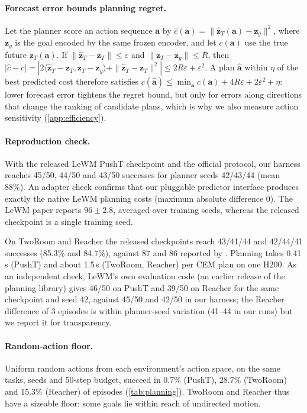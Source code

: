 \paragraph{Forecast error bounds planning regret.} Let the planner score an action sequence $\mathbf{a}$ by
$\hat c(\mathbf{a})=\|\hat{\mathbf{z}}_T(\mathbf{a})-\mathbf{z}_g\|^2$, where $\mathbf{z}_g$ is the goal encoded by the same
frozen encoder, and let $c(\mathbf{a})$ use the true future $\mathbf{z}_T(\mathbf{a})$. If
$\|\hat{\mathbf{z}}_T-\mathbf{z}_T\|\le\varepsilon$ and $\|\mathbf{z}_T-\mathbf{z}_g\|\le R$, then
$|\hat c-c|=|2\langle\hat{\mathbf{z}}_T-\mathbf{z}_T,\mathbf{z}_T-\mathbf{z}_g\rangle+\|\hat{\mathbf{z}}_T-\mathbf{z}_T\|^2|\le2R\varepsilon+\varepsilon^2$.
A plan $\hat{\mathbf{a}}$ within $\eta$ of the best predicted cost therefore satisfies
$c(\hat{\mathbf{a}})\le\min_{\mathbf{a}}c(\mathbf{a})+4R\varepsilon+2\varepsilon^2+\eta$: lower forecast error tightens the
regret bound, but only for errors along directions that change the ranking of candidate plans, which is why we also
measure action sensitivity (\cref{app:efficiency}).

\paragraph{Reproduction check.} With the released LeWM PushT checkpoint and the official protocol,
our harness reaches 45/50, 44/50 and 43/50 successes for planner seeds 42/43/44 (mean 88\%). An
adapter check confirms that our pluggable predictor interface produces exactly the native LeWM
planning costs (maximum absolute difference 0). The LeWM paper reports $96\pm2.8$, averaged over
training seeds, whereas the released checkpoint is a single training seed.

On TwoRoom and Reacher the
released checkpoints reach 43/41/44 and 42/44/41 successes (85.3\% and 84.7\%), against 87 and 86
reported by \citet{maes2026lewm}. Planning takes 0.41\,s (PushT) and about 1.5\,s (TwoRoom, Reacher)
per CEM plan on one H200. As an independent check, LeWM's own evaluation code (an earlier release of the planning library) gives 46/50 on PushT and 39/50 on Reacher for the same checkpoint and seed 42, against 45/50 and 42/50 in our harness; the Reacher difference of 3 episodes is within planner-seed variation (41--44 in our runs) but we report it for transparency.

\paragraph{Random-action floor.} Uniform random actions from each environment's action space, on the same tasks, seeds
and 50-step budget, succeed in 0.7\% (PushT), 28.7\% (TwoRoom) and 15.3\% (Reacher) of episodes (\cref{tab:planning}).
TwoRoom and Reacher thus have a sizeable floor: some goals lie within reach of undirected motion.

